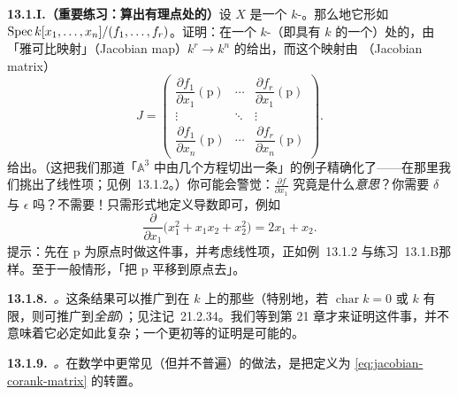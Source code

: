 \textbf{13.1.I.（重要练习：\trJacobianMatrix{}算出有理点处的\trZariski{}\trCotangentSpace）}\quad 设 $X$ 是一个\trFiniteType{} $k$-\trScheme。那么\trLocally{}地它形如 $\operatorname{Spec} k[x_1,\dots,x_n]/(f_1,\dots,f_r)$。证明：在一个 $k$-\trValuedPoint（即具有\trResidueField{} $k$ 的一个\trClosedPoint）处的\trZariski{}\trCotangentSpace，由「雅可比映射」（Jacobian map）$k^r\to k^n$ 的\trCokernel{}给出，而这个映射由 \textbf{\trJacobianMatrix}（Jacobian matrix）
\begin{equation*}\tag{13.1.7.1}\label{eq:jacobian-corank-matrix}
J=
\begin{pmatrix}
\dfrac{\partial f_1}{\partial x_1}(\mathrm{p}) & \cdots & \dfrac{\partial f_r}{\partial x_1}(\mathrm{p})\\
\vdots & \ddots & \vdots\\
\dfrac{\partial f_1}{\partial x_n}(\mathrm{p}) & \cdots & \dfrac{\partial f_r}{\partial x_n}(\mathrm{p})
\end{pmatrix}.
\end{equation*}
给出。（这把我们那道「$\mathbb{A}^3$ 中由几个方程切出一条\trCurve」的例子精确化了——在那里我们挑出了线性项；见例~13.1.2。）你可能会警觉：$\frac{\partial f}{\partial x_1}$ 究竟是什么\emph{意思}？你需要 $\delta$ 与 $\epsilon$ 吗？不需要！只需形式地定义导数即可，例如
\[
\frac{\partial}{\partial x_1}\bigl(x_1^2+x_1x_2+x_2^2\bigr)=2x_1+x_2.
\]
提示：先在 $\mathrm{p}$ 为原点时做这件事，并考虑线性项，正如例~13.1.2 与\mbox{练习~13.1.B}那样。至于一般情形，「把 $\mathrm{p}$ 平移到原点去」。

\textbf{13.1.8.}\ \emph{\trhRemark{}。}\quad 这条结果可以推广到\trResidueField{}在 $k$ 上\trSeparable{}的那些\trClosedPoint（特别地，若 $\operatorname{char}k=0$ 或 $k$ 有限，则可推广到\emph{全部}\trClosedPoint）；见注记~21.2.34。我们等到第 21 章才来证明这件事，并不意味着它必定如此复杂；一个更初等的证明是可能的。

\textbf{13.1.9.}\ \emph{\trhWarning{}。}\quad 在数学中更常见（但并不普遍）的做法，是把\trJacobianMatrix{}定义为 \eqref{eq:jacobian-corank-matrix} 的转置。

